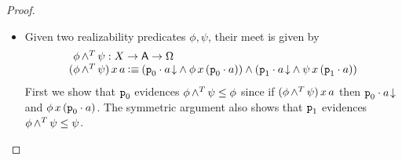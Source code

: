 \documentclass[11pt]{article}
\begin{document}
\begin{proof}
\begin{itemize}
    \item Given two realizability predicates \(\phi,\psi\), their meet is given
      by
      \[
        \begin{array}{l}
          \phantom{(}\TAnd{\phi}{\psi} : \IRealPred{X}
          \\
          {(\TAnd{\phi}{\psi})\,x\,a}
          \IsDefined
          {\IAnd%
          {(\IAnd{\ITotal{\IPAp{\IFstCode}{a}}}{\phi\,x\,(\IPAp{\IFstCode}{a})})}%
          {(\IAnd{\ITotal{\IPAp{\ISndCode}{a}}}{\psi\,x\,(\IPAp{\ISndCode}{a})})}
          }
        \end{array}
      \]
      First we show that \(\texttt{p}_0\) evidences
      \({{\phi}\mathop{{\land^{T}}}{\psi}}\leq{\phi}\) since if
      \(({\phi}\mathop{{\land^{T}}}{\psi})\,x\,a\) then \({{{\texttt{p}_0}\cdot{a}}\!\downarrow}\) and
      \(\phi\,x\,({\texttt{p}_0}\cdot{a})\).
      The symmetric argument also shows that \(\texttt{p}_1\) evidences
      \({{\phi}\mathop{{\land^{T}}}{\psi}}\leq{\psi}\).


\end{itemize}
\end{proof}
\end{document}
